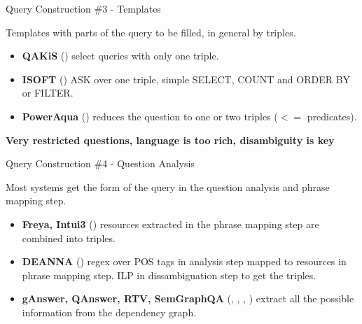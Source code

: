 \documentclass{beamer}
\begin{document}
\begin{frame}{Query Construction \#3 - Templates}
  \begin{card}
    Templates with parts of the query to be filled, in general by triples.
    \begin{itemize}
      \item \textbf{QAKiS} (\cite{cabrio2012a}) select queries with only one triple.
      \item \textbf{ISOFT} (\cite{park2014a}) ASK over one triple, simple SELECT, COUNT and ORDER BY or FILTER.
      \item \textbf{PowerAqua} (\cite{lopez2012a}) reduces the question to one or two triples ($<=$ predicates).
    \end{itemize}
    \textbf{Very restricted questions, language is too rich, disambiguity is key}
  \end{card}
\end{frame}

\begin{frame}{Query Construction \#4 - Question Analysis}
  \begin{card}
    Most systems get the form of the query in the question analysis and phrase mapping step.
    \begin{itemize}
      \item \textbf{Freya, Intui3} (\cite{dima2014a}) resources extracted in the phrase mapping step are combined into triples.
      \item \textbf{DEANNA} (\cite{yahya2013a}) regex over POS tags in analysis step mapped to resources in phrase mapping step. ILP in dissambiguation step to get the triples.
      \item \textbf{gAnswer, QAnswer, RTV, SemGraphQA} (\cite{zou2014a}, \cite{ruseti2015a}, \cite{giannone2013a}, \cite{beaumont2015a}) extract all the possible information from the dependency graph.
    \end{itemize}
  \end{card}
\end{frame}

\end{document}

